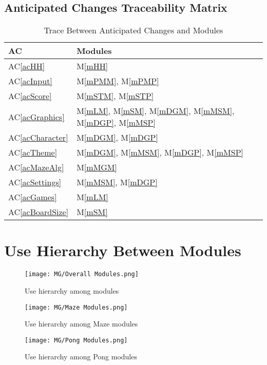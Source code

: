 \documentclass[12pt, titlepage]{article}
\newcommand{\acref}[1]{AC\ref{#1}}
\newcommand{\mref}[1]{M\ref{#1}}
\begin{document}
\subsection{Anticipated Changes Traceability Matrix}
\begin{table}[H]
\centering
\begin{tabular}{p{} p{}}
\toprule
\textbf{AC} & \textbf{Modules}\\
\midrule
\acref{acHH} & \mref{mHH}\\
\acref{acInput} & \mref{mPMM}, \mref{mPMP}\\
\acref{acScore} & \mref{mSTM}, \mref{mSTP}\\
\acref{acGraphics} & \mref{mLM}, \mref{mSM}, \mref{mDGM}, \mref{mMSM}, \mref{mDGP}, \mref{mMSP}\\
\acref{acCharacter} & \mref{mDGM}, \mref{mDGP}\\
\acref{acTheme} & \mref{mDGM}, \mref{mMSM}, \mref{mDGP}, \mref{mMSP}\\
\acref{acMazeAlg} & \mref{mMGM}\\
\acref{acSettings} & \mref{mMSM}, \mref{mDGP}\\
\acref{acGames} & \mref{mLM}\\
\acref{acBoardSize} & \mref{mSM}\\
\bottomrule
\end{tabular}
\caption{Trace Between Anticipated Changes and Modules}
\label{TblACT}
\end{table}
\newpage

\section{Use Hierarchy Between Modules} \label{SecUse}

\begin{figure}[H]
\centering
\texttt{[image: MG/Overall Modules.png]}
\caption{Use hierarchy among modules}
\label{FigUH}
\end{figure}

\begin{figure}[H]
\centering
\texttt{[image: MG/Maze Modules.png]}
\caption{Use hierarchy among Maze modules}
\label{FigUHM}
\end{figure}

\begin{figure}[H]
\centering
\texttt{[image: MG/Pong Modules.png]}
\caption{Use hierarchy among Pong modules}
\label{FigUHP}
\end{figure}
\end{document}
